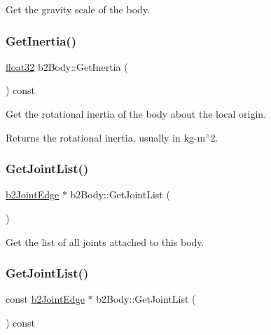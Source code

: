 Get the gravity scale of the body. 

\mbox{\label{classb2_body_a60929c13e4b6548492dca5ec79f159db}} 
\subsubsection{\texorpdfstring{GetInertia()}{GetInertia()}}
{\footnotesize\ttfamily \mbox{\hyperlink{b2_settings_8h_aacdc525d6f7bddb3ae95d5c311bd06a1}{float32}} b2\+Body\+::\+Get\+Inertia (\begin{DoxyParamCaption}{ }\end{DoxyParamCaption}) const\hspace{0.3cm}{\ttfamily [inline]}}

Get the rotational inertia of the body about the local origin. \begin{DoxyReturn}{Returns}
the rotational inertia, usually in kg-\/m$^\wedge$2. 
\end{DoxyReturn}
\mbox{\label{classb2_body_a55cf2eb851780599ca5c1f6f25a17e41}} 
\subsubsection{\texorpdfstring{GetJointList()}{GetJointList()}\hspace{0.1cm}{\footnotesize\ttfamily [1/2]}}
{\footnotesize\ttfamily \mbox{\hyperlink{structb2_joint_edge}{b2\+Joint\+Edge}} $\ast$ b2\+Body\+::\+Get\+Joint\+List (\begin{DoxyParamCaption}{ }\end{DoxyParamCaption})\hspace{0.3cm}{\ttfamily [inline]}}



Get the list of all joints attached to this body. 

\mbox{\label{classb2_body_a3e581c94ae0fbc4e1083bf6ed8c0f0a9}} 
\subsubsection{\texorpdfstring{GetJointList()}{GetJointList()}\hspace{0.1cm}{\footnotesize\ttfamily [2/2]}}
{\footnotesize\ttfamily const \mbox{\hyperlink{structb2_joint_edge}{b2\+Joint\+Edge}} $\ast$ b2\+Body\+::\+Get\+Joint\+List (\begin{DoxyParamCaption}{ }\end{DoxyParamCaption}) const\hspace{0.3cm}{\ttfamily [inline]}}

